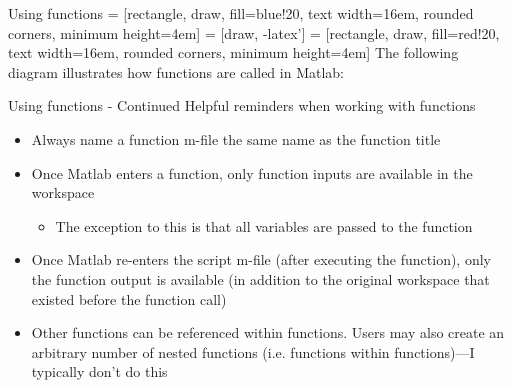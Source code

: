 \documentclass[english,xcolor=dvipsnames]{beamer}
\begin{document}
\begin{frame}{Using functions}
 = [rectangle, draw, fill=blue!20, 
    text width=16em, rounded corners, minimum height=4em]
 = [draw, -latex']
 = [rectangle, draw, fill=red!20, 
    text width=16em, rounded corners, minimum height=4em]
The following diagram illustrates how functions are called in Matlab:
\end{frame}

\begin{frame}{Using functions - Continued}
Helpful reminders when working with functions
\begin{itemize}
	\item Always name a function m-file the same name as the function title
	\item Once Matlab enters a function, only function inputs are available in the workspace
	\begin{itemize}
		\item The exception to this is that all  variables are passed to the function
	\end{itemize}
	\item Once Matlab re-enters the script m-file (after executing the function), only the function output is available (in addition to the original workspace that existed before the function call)
	\item Other functions can be referenced within functions. Users may also create an arbitrary number of nested functions (i.e. functions within functions)---I typically don't do this
\end{itemize}
\end{frame}
\end{document}
